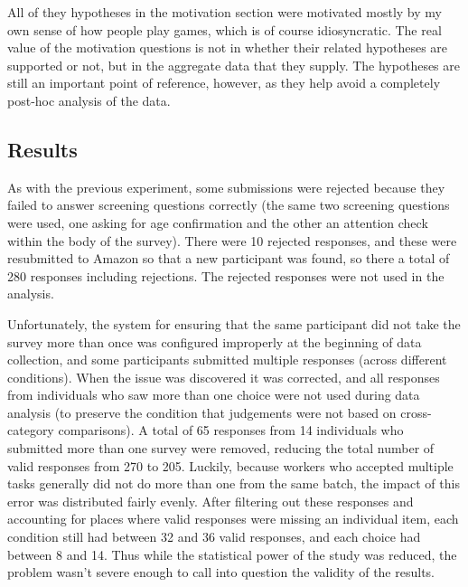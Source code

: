 All of they hypotheses in the motivation section were motivated mostly by my own sense of how people play games, which is of course idiosyncratic.
%
The real value of the motivation questions is not in whether their related hypotheses are supported or not, but in the aggregate data that they supply.
%
The hypotheses are still an important point of reference, however, as they help avoid a completely post-hoc analysis of the data.

\subsection{Results}

As with the previous experiment, some submissions were rejected because they failed to answer screening questions correctly (the same two screening questions were used, one asking for age confirmation and the other an attention check within the body of the survey).
%
There were 10 rejected responses, and these were resubmitted to Amazon so that a new participant was found, so there a total of 280 responses including rejections.
%
The rejected responses were not used in the analysis.


Unfortunately, the system for ensuring that the same participant did not take the survey more than once was configured improperly at the beginning of data collection, and some participants submitted multiple responses (across different conditions).
%
When the issue was discovered it was corrected, and all responses from individuals who saw more than one choice were not used during data analysis (to preserve the condition that judgements were not based on cross-category comparisons).
%
A total of 65 responses from 14 individuals who submitted more than one survey were removed, reducing the total number of valid responses from 270 to 205.
%
Luckily, because workers who accepted multiple tasks generally did not do more than one from the same batch, the impact of this error was distributed fairly evenly.
%
After filtering out these responses and accounting for places where valid responses were missing an individual item, each condition still had between 32 and 36 valid responses, and each choice had between 8 and 14.
%
Thus while the statistical power of the study was reduced, the problem wasn't severe enough to call into question the validity of the results.


